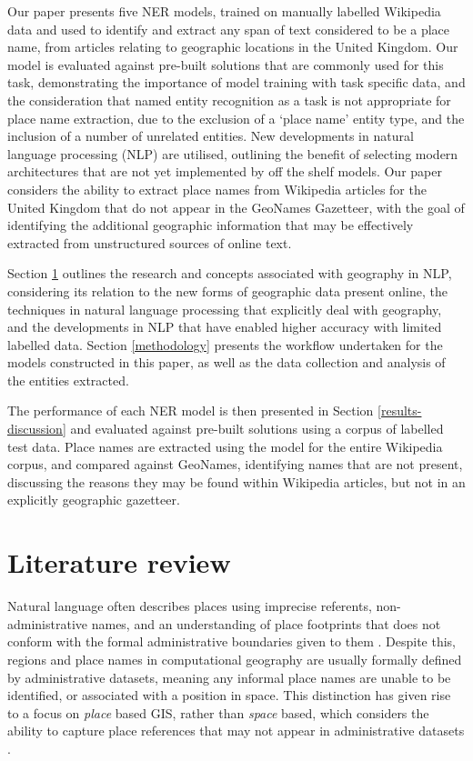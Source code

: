 \documentclass[]{interact}
\theoremstyle{plain}%
\theoremstyle{definition}
\theoremstyle{remark}
\begin{document}
Our paper presents five NER models, trained on manually labelled
Wikipedia data and used to identify and extract any span of text
considered to be a place name, from articles relating to geographic
locations in the United Kingdom. Our model is evaluated against
pre-built solutions that are commonly used for this task, demonstrating
the importance of model training with task specific data, and the
consideration that named entity recognition as a task is not appropriate
for place name extraction, due to the exclusion of a `place name' entity
type, and the inclusion of a number of unrelated entities. New
developments in natural language processing (NLP) are utilised,
outlining the benefit of selecting modern architectures that are not yet
implemented by off the shelf models. Our paper considers the ability to
extract place names from Wikipedia articles for the United Kingdom that
do not appear in the GeoNames Gazetteer, with the goal of identifying
the additional geographic information that may be effectively extracted
from unstructured sources of online text.

Section \ref{literature-review} outlines the research and concepts
associated with geography in NLP, considering its relation to the new
forms of geographic data present online, the techniques in natural
language processing that explicitly deal with geography, and the
developments in NLP that have enabled higher accuracy with limited
labelled data. Section \ref{methodology} presents the workflow
undertaken for the models constructed in this paper, as well as the data
collection and analysis of the entities extracted.

The performance of each NER model is then presented in Section
\ref{results-discussion} and evaluated against pre-built solutions using
a corpus of labelled test data. Place names are extracted using the
model for the entire Wikipedia corpus, and compared against GeoNames,
identifying names that are not present, discussing the reasons they may
be found within Wikipedia articles, but not in an explicitly geographic
gazetteer.

\hypertarget{literature-review}{%
\section{Literature review}\label{literature-review}}

Natural language often describes places using imprecise referents,
non-administrative names, and an understanding of place footprints that
does not conform with the formal administrative boundaries given to them
\citep{gao2017, goodchild2011}. Despite this, regions and place names in
computational geography are usually formally defined by administrative
datasets, meaning any informal place names are unable to be identified,
or associated with a position in space. This distinction has given rise
to a focus on \emph{place} based GIS, rather than \emph{space} based,
which considers the ability to capture place references that may not
appear in administrative datasets \citep{gao2013}.
\end{document}
